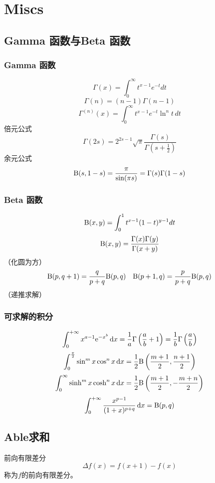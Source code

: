 \chapter{Miscs}
\section{Gamma 函数与Beta 函数}

\subsection{Gamma 函数}
\[
    \Gamma(x) = \int_0^\infty t^{x-1} e^{-t} dt
\]
\[
    \Gamma(n) = (n-1)\Gamma(n-1)
\]
\[
    \Gamma^{(n)}(x) = \int_0^\infty t^{x-1} e^{-t} \ln^n t \, dt
\]
倍元公式
\[
    \Gamma(2s) = 2^{2s-1} \sqrt{\pi}
    \frac{\Gamma(s)}{\Gamma(s+\frac{1}{2})}
\]
余元公式
\[
    \mathrm{B}(s, 1-s) = \frac{\pi}{\sin(\pi s)} = \Gamma(s)
    \Gamma(1-s)
\]
\subsection{Beta 函数}

\[
    \mathrm{B}(x, y) = \int_0^1 t^{x-1} (1-t)^{y-1} dt
\]
\[
    \mathrm{B}(x, y) = \frac{\Gamma(x) \Gamma(y)}{\Gamma(x+y)}
\]
（化圆为方）
\[
    \mathrm{B}(p ,q+1) = \frac{q}{p+q} \mathrm{B}(p,q) \quad
    \mathrm{B}(p+1, q) = \frac{p}{p+q} \mathrm{B}(p,q)
\]
（递推求解）
\subsection{可求解的积分}
\[
    \int_{0}^{+\infty} x^{a-1} \e^{-x^{b}} \d{x} =
    \frac{1}{a} \Gamma\left( \frac{a}{b} +1 \right) = \frac{1}{b}
    \Gamma\left(\frac{a}{b}\right)
\]
\[
    \int_{0}^{\frac{\pi}{2}} \sin^{m} x \cos^{n} x \d{x} =
    \frac{1}{2} \betafunc\left(\frac{m+1}{2}, \frac{n+1}{2}\right)
\]
\[
    \int_{0}^{\infty} \sinh^{m} x \cosh^{n} x \d{x} =
    \frac{1}{2} \betafunc\left(\frac{m+1}{2}, -\frac{m+n}{2}\right)
\]
\[
    \int_{0}^{+\infty } \frac{x^{p-1}}{(1+x)^{p+q}} \d{x} =
    \betafunc(p, q)
\]

\section{Able求和}
\begin{definition}{前向有限差分}
    \[
        \Delta f(x) = f(x+1) - f(x)
    \]
    称为\(f\)的前向有限差分。
\end{definition}

